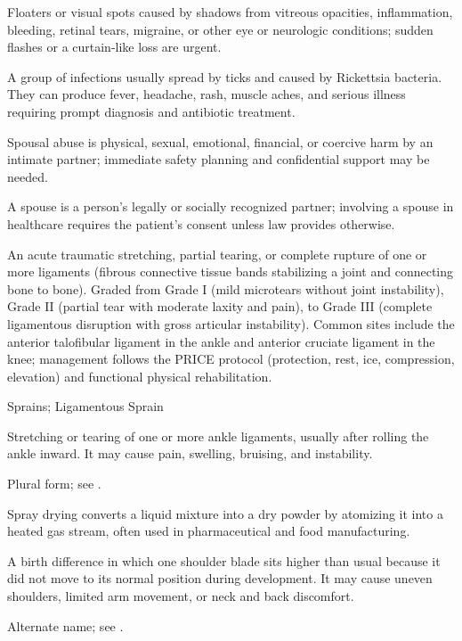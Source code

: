  Floaters or visual spots caused by shadows from vitreous opacities, inflammation, bleeding, retinal tears, migraine, or other eye or neurologic conditions; sudden flashes or a curtain-like loss are urgent.

 A group of infections usually spread by ticks and caused by Rickettsia bacteria. They can produce fever, headache, rash, muscle aches, and serious illness requiring prompt diagnosis and antibiotic treatment.

 Spousal abuse is physical, sexual, emotional, financial, or coercive harm by an intimate partner; immediate safety planning and confidential support may be needed.

 A spouse is a person’s legally or socially recognized partner; involving a spouse in healthcare requires the patient’s consent unless law provides otherwise.

 An acute traumatic stretching, partial tearing, or complete rupture of one or more ligaments (fibrous connective tissue bands stabilizing a joint and connecting bone to bone). Graded from Grade I (mild microtears without joint instability), Grade II (partial tear with moderate laxity and pain), to Grade III (complete ligamentous disruption with gross articular instability). Common sites include the anterior talofibular ligament in the ankle and anterior cruciate ligament in the knee; management follows the PRICE protocol (protection, rest, ice, compression, elevation) and functional physical rehabilitation.

\synonyms
Sprains; Ligamentous Sprain

 Stretching or tearing of one or more ankle ligaments, usually after rolling the ankle inward. It may cause pain, swelling, bruising, and instability.

 Plural form; see .

 Spray drying converts a liquid mixture into a dry powder by atomizing it into a heated gas stream, often used in pharmaceutical and food manufacturing.

 A birth difference in which one shoulder blade sits higher than usual because it did not move to its normal position during development. It may cause uneven shoulders, limited arm movement, or neck and back discomfort.

 Alternate name; see .

